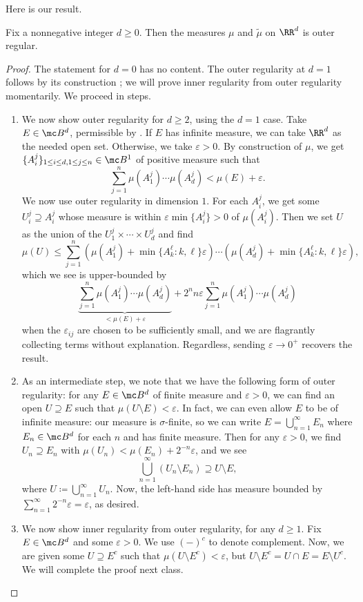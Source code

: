 \documentclass[../notes.tex]{subfiles}
\begin{document}
Here is our result.
\begin{theorem}
	Fix a nonnegative integer $d\ge0$. Then the measures $\mu$ and $\widetilde\mu$ on $\RR^d$ is outer regular.
\end{theorem}
\begin{proof}
	The statement for $d=0$ has no content. The outer regularity at $d=1$ follows by its construction \cite[Lemma~6.15]{elber-top}; we will prove inner regularity from outer regularity momentarily. We proceed in steps.
	\begin{enumerate}
		\item We now show outer regularity for $d\ge2$, using the $d=1$ case. Take $E\in\mc B^d$, permissible by . If $E$ has infinite measure, we can take $\RR^d$ as the needed open set. Otherwise, we take $\varepsilon>0$. By construction of $\mu$, we get $\{A_i^j\}_{1\le i\le d,1\le j\le n}\in\mc B^1$ of positive measure such that
		\[\sum_{j=1}^n\mu(A_1^j)\cdots\mu(A_d^j)<\mu(E)+\varepsilon.\]
		We now use outer regularity in dimension $1$. For each $A_i^j$, we get some $U_i^j\supseteq A_i^j$ whose measure is within $\varepsilon\min\{A_i^j\}>0$ of $\mu(A_i^j)$. Then we set $U$ as the union of the $U_1^j\times\cdots\times U_d^j$ and find
		\[\mu(U)\le\sum_{j=1}^n\left(\mu(A_1^j)+\min\{A_k^\ell:k,\ell\}\varepsilon\right)\cdots\left(\mu(A_d^j)+\min\{A_k^\ell:k,\ell\}\varepsilon\right),\]
		which we see is upper-bounded by
		\[\underbrace{\sum_{j=1}^n\mu(A^j_1)\cdots\mu(A^j_d)}_{<\mu(E)+\varepsilon}{}+2^nn\varepsilon\sum_{j=1}^n\mu(A^j_1)\cdots\mu(A^j_d)\]
		when the $\varepsilon_{ij}$ are chosen to be sufficiently small, and we are flagrantly collecting terms without explanation. Regardless, sending $\varepsilon\to0^+$ recovers the result.

		\item As an intermediate step, we note that we have the following form of outer regularity: for any $E\in\mc B^d$ of finite measure and $\varepsilon>0$, we can find an open $U\supseteq E$ such that $\mu(U\setminus E)<\varepsilon$. In fact, we can even allow $E$ to be of infinite measure: our measure is $\sigma$-finite, so we can write $E=\bigcup_{n=1}^\infty E_n$ where $E_n\in\mc B^d$ for each $n$ and has finite measure. Then for any $\varepsilon>0$, we find $U_n\supseteq E_n$ with $\mu(U_n)<\mu(E_n)+2^{-n}\varepsilon$, and we see
		\[\bigcup_{n=1}^\infty(U_n\setminus E_n)\supseteq U\setminus E,\]
		where $U\coloneqq\bigcup_{n=1}^\infty U_n$. Now, the left-hand side has measure bounded by $\sum_{n=1}^\infty2^{-n}\varepsilon=\varepsilon$, as desired.

		\item We now show inner regularity from outer regularity, for any $d\ge1$. Fix $E\in\mc B^d$ and some $\varepsilon>0$. We use $(-)^c$ to denote complement. Now, we are given some $U\supseteq E^c$ such that $\mu(U\setminus E^c)<\varepsilon$, but $U\setminus E^c=U\cap E=E\setminus U^c$. We will complete the proof next class.
		\qedhere
	\end{enumerate}
\end{proof}
\end{document}
